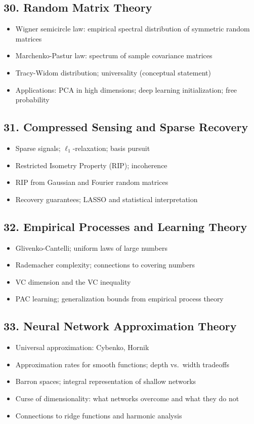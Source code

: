 \subsection{30. Random Matrix Theory}
\begin{itemize}
\item Wigner semicircle law: empirical spectral distribution of symmetric random matrices
\item Marchenko-Pastur law: spectrum of sample covariance matrices
\item Tracy-Widom distribution; universality (conceptual statement)
\item Applications: PCA in high dimensions; deep learning initialization; free probability
\end{itemize}

\subsection{31. Compressed Sensing and Sparse Recovery}
\begin{itemize}
\item Sparse signals; $\ell_1$-relaxation; basis pursuit
\item Restricted Isometry Property (RIP); incoherence
\item RIP from Gaussian and Fourier random matrices
\item Recovery guarantees; LASSO and statistical interpretation
\end{itemize}

\subsection{32. Empirical Processes and Learning Theory}
\begin{itemize}
\item Glivenko-Cantelli; uniform laws of large numbers
\item Rademacher complexity; connections to covering numbers
\item VC dimension and the VC inequality
\item PAC learning; generalization bounds from empirical process theory
\end{itemize}

\subsection{33. Neural Network Approximation Theory}
\begin{itemize}
\item Universal approximation: Cybenko, Hornik
\item Approximation rates for smooth functions; depth vs.\ width tradeoffs
\item Barron spaces; integral representation of shallow networks
\item Curse of dimensionality: what networks overcome and what they do not
\item Connections to ridge functions and harmonic analysis
\end{itemize}

